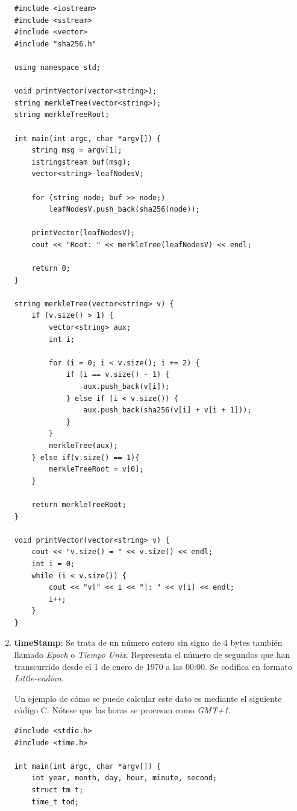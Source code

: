 \documentclass{article}
\begin{document}
\begin{enumerate}
        \begin{verbatim}
#include <iostream>
#include <sstream>
#include <vector>
#include "sha256.h"
 
using namespace std;
 
void printVector(vector<string>);
string merkleTree(vector<string>);
string merkleTreeRoot;
 
int main(int argc, char *argv[]) {
    string msg = argv[1];
    istringstream buf(msg);
    vector<string> leafNodesV;
    
    for (string node; buf >> node;)
        leafNodesV.push_back(sha256(node));
        
    printVector(leafNodesV);
    cout << "Root: " << merkleTree(leafNodesV) << endl;
    
    return 0;
}

string merkleTree(vector<string> v) {
    if (v.size() > 1) {
        vector<string> aux;
        int i;
        
        for (i = 0; i < v.size(); i += 2) {
            if (i == v.size() - 1) {
                aux.push_back(v[i]);
            } else if (i < v.size()) {
                aux.push_back(sha256(v[i] + v[i + 1]));
            }
        }
        merkleTree(aux);
    } else if(v.size() == 1){
        merkleTreeRoot = v[0];
    }
    
    return merkleTreeRoot;
}

void printVector(vector<string> v) {
    cout << "v.size() = " << v.size() << endl;
    int i = 0;
    while (i < v.size()) {
        cout << "v[" << i << "]: " << v[i] << endl;
        i++;
    }
}
        \end{verbatim}
        
        \item \textbf{timeStamp}: Se trata de un número entero sin signo de 4 bytes también llamado \textit{Epoch} o \textit{Tiempo Unix}. Representa el número de segundos que han transcurrido desde el 1 de enero de 1970 a las 00:00. Se codifica en formato \textit{Little-endian}.
        
        Un ejemplo de cómo se puede calcular este dato es mediante el siguiente código C. Nótese que las horas se procesan como \textit{GMT+1}.
        
        \begin{verbatim}
#include <stdio.h>
#include <time.h>

int main(int argc, char *argv[]) {
    int year, month, day, hour, minute, second;
    struct tm t;
    time_t tod;
    

\end{verbatim}
\end{enumerate}
\end{document}
